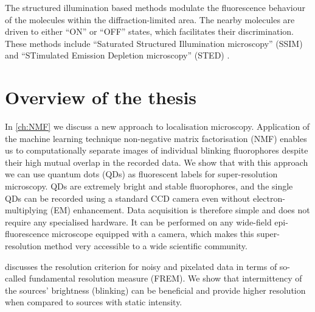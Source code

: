 The structured illumination based methods modulate the fluorescence behaviour of the molecules within the diffraction-limited area. The nearby molecules are driven to either ``ON'' or ``OFF'' states, which facilitates their discrimination.  These methods include ``Saturated Structured Illumination microscopy'' (SSIM) \cite{Gustafsson2000,Heintzmann2002} and ``STimulated Emission Depletion microscopy'' (STED) \cite{Hell1994}. 




\clearpage
\section{Overview of the thesis}

In \autoref{ch:NMF} we discuss a new approach to localisation microscopy. Application of the machine learning technique non-negative matrix factorisation (NMF) enables us to computationally separate images of individual blinking fluorophores despite their high mutual overlap in the recorded data. We show that with this approach we can use quantum dots (QDs) as fluorescent labels for super-resolution microscopy. QDs are extremely bright and stable fluorophores, and the single QDs can be recorded using a standard CCD camera even without electron-multiplying (EM) enhancement. Data acquisition is therefore simple and does not require any specialised hardware. It can be performed on any wide-field epi-fluorescence microscope equipped with a camera, which makes this super-resolution method very accessible to a wide scientific community. 

 discusses the resolution criterion for noisy and pixelated data in terms of so-called fundamental resolution measure (FREM). We show that intermittency of the sources' brightness (blinking) can be beneficial and provide higher resolution when compared to sources with static intensity. 

